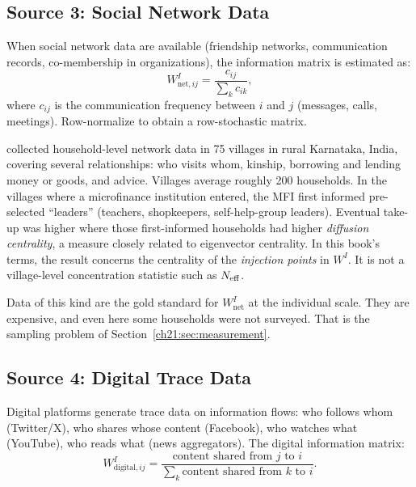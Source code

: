 \documentclass[../structural_economics_book.tex]{subfiles}
\begin{document}
\subsection{Source 3: Social Network Data}

\begin{definition}\label{ch21:def:network_WI}
When social network data are available (friendship networks, communication records, co-membership in organizations), the information matrix is estimated as:
\begin{equation}\label{ch21:eq:network_WI}
W^I_{\text{net}, ij} = \frac{c_{ij}}{\sum_k c_{ik}},
\end{equation}
where $c_{ij}$ is the communication frequency between $i$ and $j$ (messages, calls, meetings). Row-normalize to obtain a row-stochastic matrix.
\end{definition}

\begin{example}\label{ch21:ex:village}
\citet*{banerjee2013diffusion} collected household-level network data in 75 villages in rural Karnataka, India, covering several relationships: who visits whom, kinship, borrowing and lending money or goods, and advice. Villages average roughly 200 households. In the villages where a microfinance institution entered, the MFI first informed pre-selected ``leaders'' (teachers, shopkeepers, self-help-group leaders). Eventual take-up was higher where those first-informed households had higher \emph{diffusion centrality}, a measure closely related to eigenvector centrality. In this book's terms, the result concerns the centrality of the \emph{injection points} in $W^I$. It is not a village-level concentration statistic such as $N_{\text{eff}}$.

Data of this kind are the gold standard for $W^I_{\text{net}}$ at the individual scale. They are expensive, and even here some households were not surveyed. That is the sampling problem of Section~\ref{ch21:sec:measurement}.
\end{example}


\subsection{Source 4: Digital Trace Data}

\begin{definition}[Digital $W^I$]\label{ch21:def:digital_WI}
Digital platforms generate trace data on information flows: who follows whom (Twitter/X), who shares whose content (Facebook), who watches what (YouTube), who reads what (news aggregators). The digital information matrix:
\begin{equation}\label{ch21:eq:digital_WI}
W^I_{\text{digital}, ij} = \frac{\text{content shared from } j \text{ to } i}{\sum_k \text{content shared from } k \text{ to } i}.
\end{equation}
\end{definition}
\end{document}
